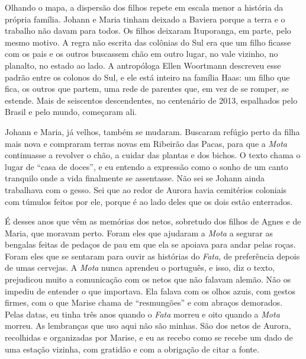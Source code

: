 \documentclass[
  brazilian,
  11pt,
  openany]{book}
\begin{document}
Olhando o mapa, a dispersão dos filhos repete em escala menor a história
da própria família. Johann e Maria tinham deixado a Baviera porque a
terra e o trabalho não davam para todos. Os filhos deixaram Ituporanga,
em parte, pelo mesmo motivo. A regra não escrita das colônias do Sul era
que um filho ficasse com os pais e os outros buscassem chão em outro
lugar, no vale vizinho, no planalto, no estado ao lado. A antropóloga
Ellen Woortmann descreveu esse padrão entre os colonos do Sul, e ele
está inteiro na família Haas: um filho que fica, os outros que partem,
uma rede de parentes que, em vez de se romper, se estende. Mais de
seiscentos descendentes, no centenário de 2013, espalhados pelo Brasil e
pelo mundo, começaram ali.

Johann e Maria, já velhos, também se mudaram. Buscaram refúgio perto da
filha mais nova e compraram terras novas em Ribeirão das Pacas, para que
a \emph{Mota} continuasse a revolver o chão, a cuidar das plantas e dos
bichos. O texto chama o lugar de ``casa de doces'', e eu entendo a
expressão como o sonho de um canto tranquilo onde a vida finalmente se
assentasse. Não sei se Johann ainda trabalhava com o gesso. Sei que ao
redor de Aurora havia cemitérios coloniais com túmulos feitos por ele,
porque é ao lado deles que os dois estão enterrados.

É desses anos que vêm as memórias dos netos, sobretudo dos filhos de
Agnes e de Maria, que moravam perto. Foram eles que ajudaram a
\emph{Mota} a segurar as bengalas feitas de pedaços de pau em que ela se
apoiava para andar pelas roças. Foram eles que se sentaram para ouvir as
histórias do \emph{Fata}, de preferência depois de umas cervejas. A
\emph{Mota} nunca aprendeu o português, e isso, diz o texto, prejudicou
muito a comunicação com os netos que não falavam alemão. Não os impediu
de entender o que importava. Ela falava com os olhos azuis, com gestos
firmes, com o que Marise chama de ``resmungões'' e com abraços
demorados. Pelas datas, eu tinha três anos quando o \emph{Fata} morreu e
oito quando a \emph{Mota} morreu. As lembranças que uso aqui não são
minhas. São dos netos de Aurora, recolhidas e organizadas por Marise, e
eu as recebo como se recebe um dado de uma estação vizinha, com gratidão
e com a obrigação de citar a fonte.
\end{document}
